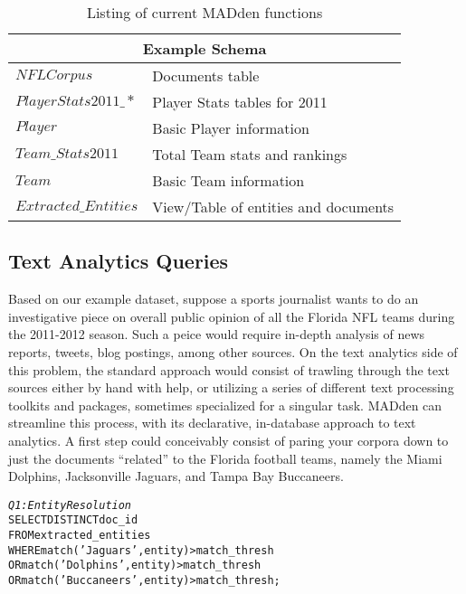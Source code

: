 \begin{table}
\begin{center}
\begin{tabular}{|l|l|}
\hline
\multicolumn{2}{|c|}{Example Schema}\\
\hline
$NFLCorpus$ & Documents table\\
\hline
$PlayerStats2011\_*$ & Player Stats tables for 2011\\
\hline
$Player$ & Basic Player information\\
\hline
$Team\_Stats2011$ & Total Team stats and rankings\\
\hline
$Team$ & Basic Team information \\
\hline
$Extracted\_Entities$ & View/Table of entities and documents \\
\hline
\end{tabular}
\end{center}
\caption{Listing of current MADden functions}
\label{tab:madschema}
\end{table}

\subsection{Text Analytics Queries}
Based on our example dataset, suppose a sports journalist
wants to do an investigative piece on overall public opinion 
of all the Florida NFL teams during the 2011-2012 season. 
Such a peice would require in-depth analysis of news reports,
tweets, blog postings, among other sources. On the text
analytics side of this problem, the standard approach would
consist of trawling through the text sources either by hand
with help, or utilizing a series of different text processing
toolkits and packages, sometimes specialized for a singular 
task. MADden can streamline this process, with its declarative,
in-database approach to text analytics. A first step could 
conceivably consist of paring your corpora down to just
the documents ``related'' to the Florida football teams, namely
the Miami Dolphins, Jacksonville Jaguars, and Tampa Bay Buccaneers. 

\begin{small}
\begin{alltt}
\textit{Q1: Entity Resolution}
SELECT DISTINCT doc_id
FROM extracted_entities
WHERE match('Jaguars', entity) > match\_thresh
   OR match('Dolphins', entity) > match\_thresh
   OR match('Buccaneers', entity) > match\_thresh;
\end{alltt}
\end{small}


